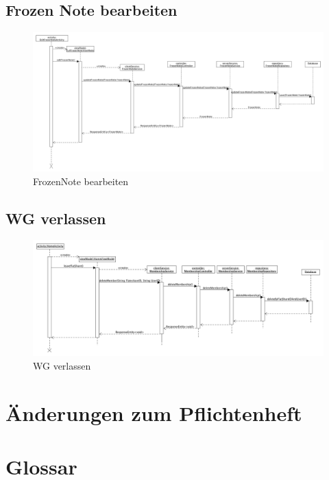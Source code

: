 \documentclass[a4paper]{scrreprt}
\begin{document}
		\section{Frozen Note bearbeiten}
 	\begin{figure}[H]
	       \centering
	       \includegraphics[scale = .25]{Sequenzdiagram_EditFrozenNote.png}
	       \caption{FrozenNote bearbeiten}
	      \end{figure}	
	      
	      	
		\newpage
		\section{WG verlassen}
		 \begin{figure}[H]
	       \centering
	       \includegraphics[scale = .30]{SD_WG_verlassen.png}
	       \caption{WG verlassen}
	      \end{figure}
	      	
	      

\chapter{Änderungen zum Pflichtenheft}
	

\chapter{Glossar}
	
\end{document}
